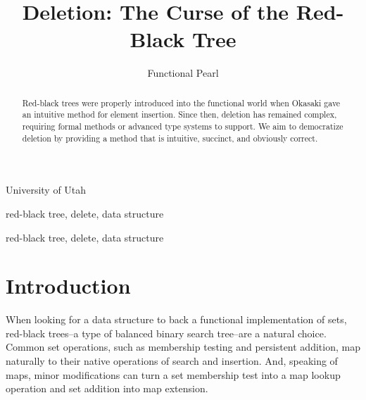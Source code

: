 \documentclass[preprint]{sigplanconf}
\begin{document}
\copyrightdata{[to be supplied]} 


\title{Deletion: The Curse of the Red-Black Tree}
\subtitle{Functional Pearl}

           {University of Utah}

\maketitle

\begin{abstract}
Red-black trees were properly introduced into the functional world when Okasaki gave an intuitive method for element insertion. Since then, deletion has remained complex, requiring formal methods or advanced type systems to support. We aim to democratize deletion by providing a method that is intuitive, succinct, and obviously correct.
\end{abstract}


\terms
red-black tree, delete, data structure

\keywords
red-black tree, delete, data structure

\section{Introduction}

When looking for a data structure to back a functional implementation of sets, red-black trees--a type of balanced binary search tree--are a natural choice. Common set operations, such as membership testing and persistent addition, map naturally to their native operations of search and insertion. And, speaking of maps, minor modifications can turn a set membership test into a map lookup operation and set addition into map extension.
\end{document}
